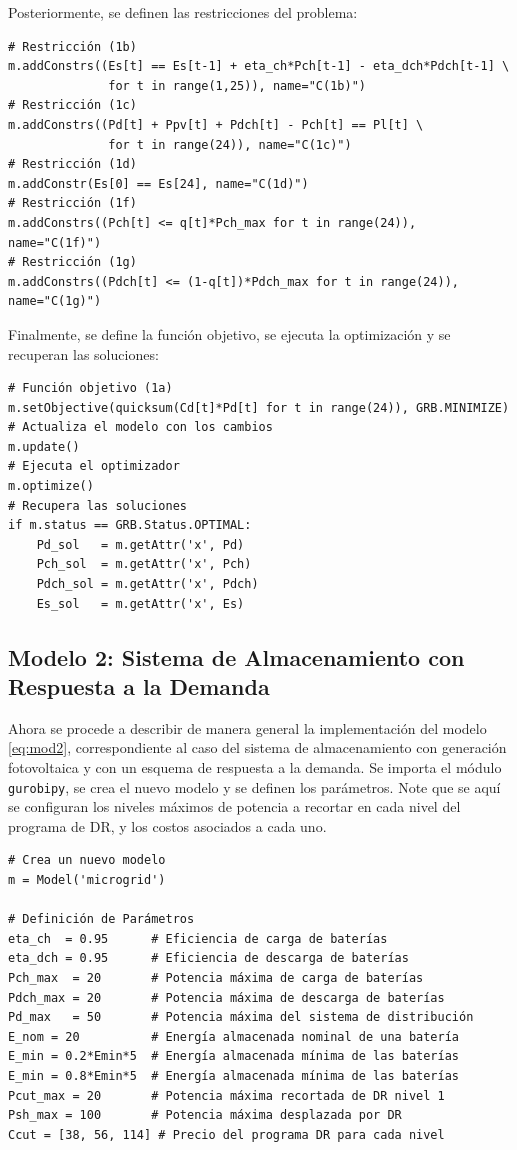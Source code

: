 Posteriormente, se definen las restricciones del problema:
\begin{verbatim}
# Restricción (1b)
m.addConstrs((Es[t] == Es[t-1] + eta_ch*Pch[t-1] - eta_dch*Pdch[t-1] \
              for t in range(1,25)), name="C(1b)")
# Restricción (1c)
m.addConstrs((Pd[t] + Ppv[t] + Pdch[t] - Pch[t] == Pl[t] \
              for t in range(24)), name="C(1c)")
# Restricción (1d)
m.addConstr(Es[0] == Es[24], name="C(1d)")
# Restricción (1f)
m.addConstrs((Pch[t] <= q[t]*Pch_max for t in range(24)), name="C(1f)")
# Restricción (1g)
m.addConstrs((Pdch[t] <= (1-q[t])*Pdch_max for t in range(24)), name="C(1g)")	
\end{verbatim}

Finalmente, se define la función objetivo, se ejecuta la optimización y se recuperan las soluciones:
\begin{verbatim}
# Función objetivo (1a) 
m.setObjective(quicksum(Cd[t]*Pd[t] for t in range(24)), GRB.MINIMIZE)
# Actualiza el modelo con los cambios
m.update()
# Ejecuta el optimizador
m.optimize()
# Recupera las soluciones
if m.status == GRB.Status.OPTIMAL:
    Pd_sol   = m.getAttr('x', Pd)
    Pch_sol  = m.getAttr('x', Pch)
    Pdch_sol = m.getAttr('x', Pdch)
    Es_sol   = m.getAttr('x', Es)	
\end{verbatim}

\subsection{Modelo 2: Sistema de Almacenamiento con Respuesta a la Demanda}\label{sec:mod2}
Ahora se procede a describir de manera general la implementación del modelo \eqref{eq:mod2}, correspondiente al caso del sistema de almacenamiento con generación fotovoltaica y con un esquema de respuesta a la demanda.
Se importa el módulo \texttt{gurobipy}, se crea el nuevo modelo y se definen los parámetros. Note que se aquí se configuran los niveles máximos de potencia a recortar en cada nivel del programa de DR, y los costos asociados a cada uno.
\begin{verbatim}
# Crea un nuevo modelo
m = Model('microgrid')

# Definición de Parámetros
eta_ch  = 0.95      # Eficiencia de carga de baterías
eta_dch = 0.95      # Eficiencia de descarga de baterías
Pch_max  = 20       # Potencia máxima de carga de baterías 
Pdch_max = 20       # Potencia máxima de descarga de baterías 
Pd_max   = 50       # Potencia máxima del sistema de distribución
E_nom = 20          # Energía almacenada nominal de una batería
E_min = 0.2*Emin*5  # Energía almacenada mínima de las baterías
E_min = 0.8*Emin*5  # Energía almacenada mínima de las baterías
Pcut_max = 20       # Potencia máxima recortada de DR nivel 1
Psh_max = 100       # Potencia máxima desplazada por DR
Ccut = [38, 56, 114] # Precio del programa DR para cada nivel
\end{verbatim}

